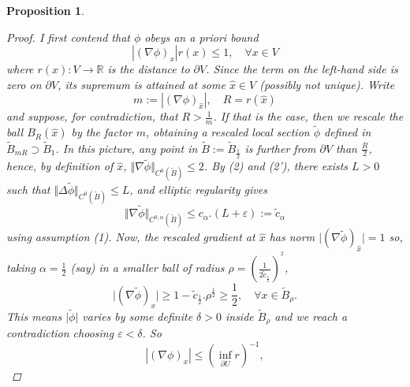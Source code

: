 \documentclass{article}
\newtheorem{proposition}[theorem]{Proposition}
\begin{document}
\begin{proposition}
\begin{proof}
I first contend that $\phi $ obeys an \emph{a priori} bound%
\begin{equation*}
        \left\vert \left( \nabla \phi \right) _{x}\right\vert r\left( x\right)         \leq
        1,\quad \forall x\in V
\end{equation*}%
where $r\left( x\right) :V\rightarrow \mathbb{R}$ is the distance to $\partial V$. Since the term on the left-hand side is zero on $\partial V$,
its supremum is attained at some $\hat{x}\in V$ (possibly not unique).
Write \begin{displaymath}
        m:= \left\vert \left( \nabla \phi \right) _{\hat{x}}\right\vert,
        \quad 
        R=r\left( \hat{x}\right) 
\end{displaymath}
and suppose, for contradiction, that $R>\frac{1}{m}$. If that is the case, then we rescale the ball $B_{R}\left( \hat{x}\right) $ by the factor $m$, obtaining a rescaled local section $\tilde{\phi}$ defined in $\tilde{B}_{mR}\supset \tilde{B}_{1}$. In
this picture, any point in $\tilde{B}:= \tilde{B}_{\frac{1}{2}}$ is
further from $\partial V$ than $\frac{R}{2}$, hence, by definition of $\hat{x}$, $\Vert \nabla \tilde{\phi}\Vert _{C^{0}\left( \tilde{B}\right)}\leq 2$. 
By (2) and (2'), there exists $L>0$ such
that 
$\Vert \Delta \tilde{\phi} \Vert _{C^{0}\left( \tilde{B}\right)}\leq L$,
and elliptic regularity gives%
\begin{equation*}
        \Vert \nabla \tilde{\phi}\Vert _{C^{0,\alpha }
        \left( \tilde{B}\right) }\leq c_{\alpha }
        .\left( L+\varepsilon \right) 
        := \tilde{c}_{\alpha }
\end{equation*}%
using assumption (1). Now, the rescaled gradient at $\hat{x}$ has norm $\vert ( \nabla \tilde{\phi}) _{\hat{x}}\vert =1$ so,
taking $\alpha =\frac{1}{2}$ (say) in a smaller ball of radius 
$\rho =(\frac{1}{2\tilde{c}_{\frac{1}{2}}})^{^2}$, 
\begin{equation*}
        \vert ( \nabla \tilde{\phi}) _{x}\vert 
        \geq 
        1-\tilde{c}_{\frac{1}{2}}.\rho ^{\frac{1}{2}}
        \geq 
        \frac{1}{2},\quad \forall x\in \tilde{B}_{\rho }.
\end{equation*}%
This means $\vert \tilde{\phi}\vert $ varies by some definite $%
\delta >0$ inside $\tilde{B}_{\rho }$ and we reach a contradiction
choosing $\varepsilon <\delta $. So%
\begin{equation*}
        \left\vert \left( \nabla \phi \right) _{x}\right\vert 
        \leq 
        \left(\inf\limits_{\partial U}r\right) ^{-1},

\end{equation*}
\end{proof}
\end{proposition}
\end{document}
